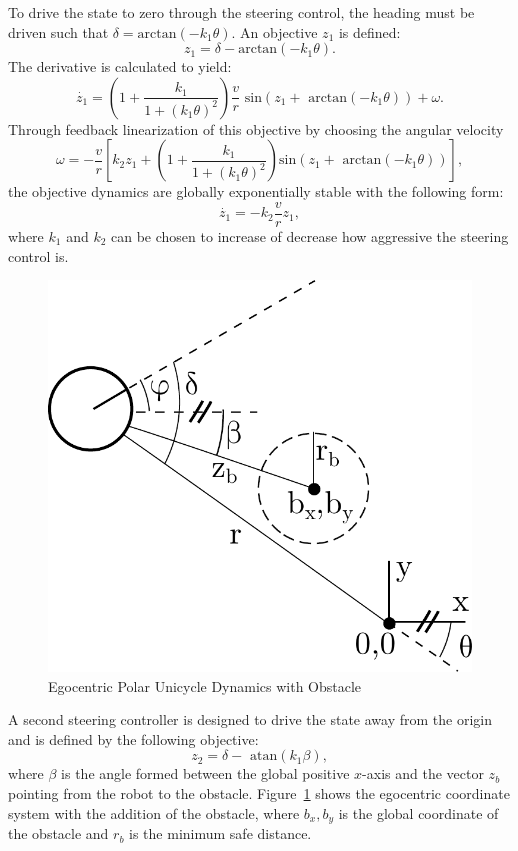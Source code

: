 \documentclass[journal]{IEEEtran}
\begin{document}
To drive the state to zero through the steering control, the heading must be driven such that $\delta = \text{arctan}(-k_1\theta).$ An objective $z_1$ is defined: $$z_1 = \delta - \text{arctan}(-k_1\theta).$$ The derivative is calculated to yield:
\begin{equation}
\dot{z_1}=\left( 1+\frac{k_1}{1+(k_1\theta)^2}\right) \frac{v}{r}\text{ sin}(z_1+\text{ arctan}(-k_1\theta))+\omega.
\end{equation}
Through feedback linearization of this objective by choosing the angular velocity $$\omega = -\frac{v}{r}\left[ k_2 z_1+\left( 1 + \frac{k_1}{1+(k_1\theta)^2} \right) \text{sin}(z_1+\text{ arctan}(-k_1\theta))\right] ,$$ 
the objective dynamics are globally exponentially stable with the following form: $$ \dot{z_1}=-k_2\frac{v}{r}z_1,$$ where $k_1$ and $k_2$ can be chosen to increase of decrease how aggressive the steering control is.

\begin{figure}[h!]
\begin{center}
\includegraphics[scale=0.45]{obs.pdf} 
\caption{Egocentric Polar Unicycle Dynamics with Obstacle\label{fig:obs}} 
\end{center}
\end{figure}

A second steering controller is designed to drive the state away from the origin and is defined by the following objective: $$z_2=\delta-\text{ atan}(k_1\beta),$$ where $\beta$ is the angle formed between the global positive $x$-axis and the vector $z_b$ pointing from the robot to the obstacle. Figure~\ref{fig:obs} shows the egocentric coordinate system with the addition of the obstacle, where $b_x,b_y$ is the global coordinate of the obstacle and $r_b$ is the minimum safe distance.
\end{document}
